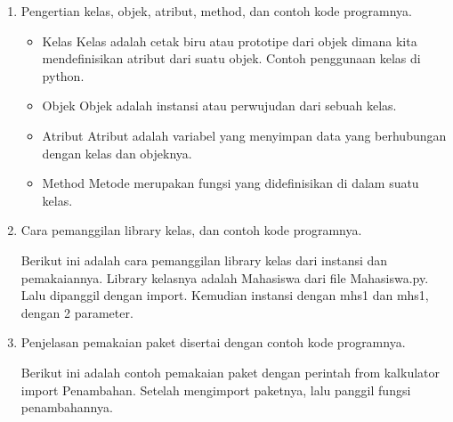 \begin{enumerate}
	\item Pengertian kelas, objek, atribut, method, dan contoh kode programnya.
	
	\begin{itemize}
		\item Kelas
		Kelas adalah cetak biru atau prototipe dari objek dimana kita mendefinisikan atribut dari suatu objek.
		Contoh penggunaan kelas di python.
		
		
		\item Objek
		Objek adalah instansi atau perwujudan dari sebuah kelas.
		
		
		\item Atribut
		Atribut adalah variabel yang menyimpan data yang berhubungan dengan kelas dan objeknya.
		
		
		\item Method
		Metode merupakan fungsi yang didefinisikan di dalam suatu kelas.
		
		
	\end{itemize}
	
	\item Cara pemanggilan library kelas, dan contoh kode programnya.
	
	Berikut ini adalah cara pemanggilan library kelas dari instansi dan pemakaiannya. Library kelasnya adalah Mahasiswa dari file Mahasiswa.py. Lalu dipanggil dengan import. Kemudian instansi dengan mhs1 dan mhs1, dengan 2 parameter.
	
	
	\item Penjelasan pemakaian paket disertai dengan contoh kode programnya.
	
	Berikut ini adalah contoh pemakaian paket dengan perintah from kalkulator import Penambahan. Setelah mengimport paketnya, lalu panggil fungsi penambahannya.
	
	

\end{enumerate}
